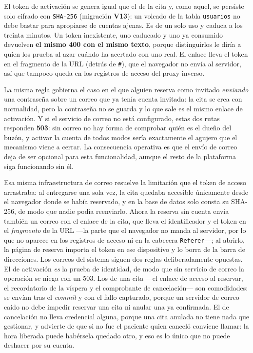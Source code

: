\documentclass[12pt,a4paper]{report}
\begin{document}
El token de activación se genera igual que el de la cita y, como aquel, se persiste solo cifrado con \texttt{SHA-256} (migración \textbf{V13}): un volcado de la tabla \texttt{usuarios} no debe bastar para apropiarse de cuentas ajenas. Es de un solo uso y caduca a los treinta minutos. Un token inexistente, uno caducado y uno ya consumido devuelven \textbf{el mismo 400 con el mismo texto}, porque distinguirlos le diría a quien los prueba al azar cuándo ha acertado con uno real. El enlace lleva el token en el fragmento de la URL (detrás de \texttt{\#}), que el navegador no envía al servidor, así que tampoco queda en los registros de acceso del proxy inverso.

La misma regla gobierna el caso en el que alguien reserva como invitado \emph{enviando} una contraseña sobre un correo que ya tenía cuenta invitada: la cita se crea con normalidad, pero la contraseña no se guarda y lo que sale es el mismo enlace de activación. Y si el servicio de correo no está configurado, estas dos rutas responden \textbf{503}: sin correo no hay forma de comprobar quién es el dueño del buzón, y activar la cuenta de todos modos sería exactamente el agujero que el mecanismo viene a cerrar. La consecuencia operativa es que el envío de correo deja de ser opcional para esta funcionalidad, aunque el resto de la plataforma siga funcionando sin él.

Esa misma infraestructura de correo resuelve la limitación que el token de acceso arrastraba: al entregarse una sola vez, la cita quedaba accesible únicamente desde el navegador donde se había reservado, y en la base de datos solo consta su SHA-256, de modo que nadie podía reenviarlo. Ahora la reserva sin cuenta envía también un correo con el enlace de la cita, que lleva el identificador y el token en el \emph{fragmento} de la URL ---la parte que el navegador no manda al servidor, por lo que no aparece en los registros de acceso ni en la cabecera \texttt{Referer}---; al abrirlo, la página de reserva importa el token en ese dispositivo y lo borra de la barra de direcciones. Los correos del sistema siguen dos reglas deliberadamente opuestas. El de activación \emph{es} la prueba de identidad, de modo que sin servicio de correo la operación se niega con un 503. Los de una cita —el enlace de acceso al reservar, el recordatorio de la víspera y el comprobante de cancelación— son comodidades: se envían tras el \emph{commit} y con el fallo capturado, porque un servidor de correo caído no debe impedir reservar una cita ni anular una ya confirmada. El de cancelación no lleva credencial alguna, porque una cita anulada no tiene nada que gestionar, y advierte de que si no fue el paciente quien canceló conviene llamar: la hora liberada puede habérsela quedado otro, y eso es lo único que no puede deshacer por su cuenta.
\end{document}
